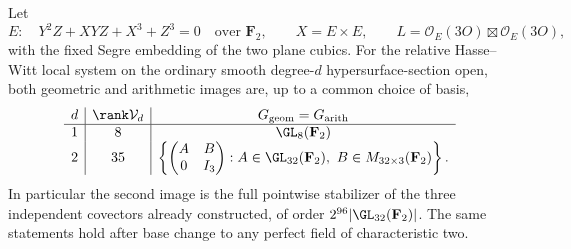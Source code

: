 \begin{theorem}
\label{thm:product-char2-two-full-groups}
Let
\[
 E:\quad Y^2Z+XYZ+X^3+Z^3=0\quad\text{over }\mathbf F_2,
 \qquad X=E\times E,
 \qquad L=\mathcal O_E(3O)\boxtimes\mathcal O_E(3O),
\]
with the fixed Segre embedding of the two plane cubics.
For the relative Hasse--Witt local system on the ordinary smooth
degree-$d$ hypersurface-section open, both geometric and arithmetic
images are, up to a common choice of basis,
\[
 \begin{array}{c|c|c}
 d&\rank\mathcal V_d&G_{\rm geom}=G_{\rm arith}\\ \hline
 1&8&\GL_8(\mathbf F_2)\\
 2&35&\left\{
       \begin{pmatrix}A&B\\0&I_3\end{pmatrix}:
       A\in\GL_{32}(\mathbf F_2),\ B\in M_{32\times3}(\mathbf F_2)
       \right\}.
 \end{array}
\]
In particular the second image is the full pointwise stabilizer of
the three independent covectors already constructed, of order
$2^{96}|\GL_{32}(\mathbf F_2)|$.  The same statements hold after
base change to any perfect field of characteristic two.
\end{theorem}

